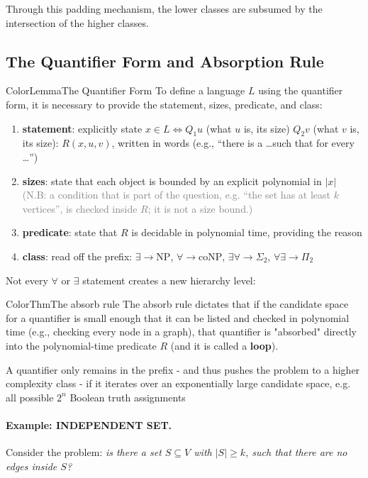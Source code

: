 \documentclass[a4paper, 11pt]{report}
\begin{document}
Through this padding mechanism, the lower classes are subsumed by the intersection of the higher classes.

\subsection{The Quantifier Form and Absorption Rule}

\begin{cframe}{ColorLemma}{The Quantifier Form}
    To define a language $L$ using the quantifier form, it is necessary to provide the statement, sizes, predicate, and class: 
    \begin{enumerate}
        \item \textbf{statement}: explicitly state $x \in L \iff Q_1 u$ (what $u$ is, its size) $Q_2 v$ (what $v$ is, its size): $R(x, u, v)$, written in words (e.g., ``there is a \dots such that for every \dots'')
        \item \textbf{sizes}: state that each object is bounded by an explicit polynomial in $|x|$\\
        \textcolor{gray}{(N.B: a condition that is part of the question, e.g. ``the set has at least $k$ vertices'', is checked inside $R$; it is not a size bound.)}
        \item \textbf{predicate}: state that $R$ is decidable in polynomial time, providing the reason
        \item \textbf{class}: read off the prefix: $\exists \to \text{NP}$, $\forall \to \text{coNP}$, $\exists\forall \to \Sigma_2$, $\forall\exists \to \Pi_2$
    \end{enumerate}
\end{cframe}


Not every $\forall $ or $\exists  $ statement creates a new hierarchy level:
\begin{cframe}{ColorThm}{The absorb rule}
The absorb rule dictates that if the candidate space for a quantifier is small enough that it can be listed and checked in polynomial time (e.g., checking every node in a graph), that quantifier is "absorbed" directly into the polynomial-time predicate $R$ (and it is called a \textbf{loop}). 

A quantifier only remains in the prefix - and thus pushes the problem to a higher complexity class - if it iterates over an exponentially large candidate space, e.g. all possible $2^n$ Boolean truth assignments 
\end{cframe}

\paragraph{Example: INDEPENDENT SET.}
Consider the problem: \textit{is there a set $S \subseteq V$ with $|S| \ge k$, such that there are no edges inside $S$?}
\end{document}
